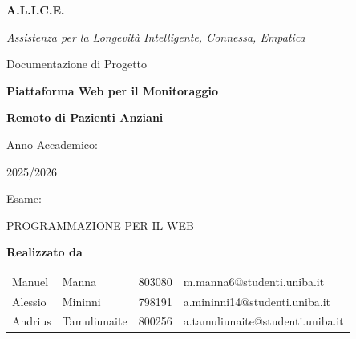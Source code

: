 \documentclass[12pt, a4paper]{article}
\begin{document}
\begin{titlepage}
  \thispagestyle{empty}
  \centering
  \vspace*{3cm}

  {\Huge\bfseries A.L.I.C.E.\par}
  \vspace{0.5cm}
  {\large\textit{Assistenza per la Longevit\`a Intelligente, Connessa, Empatica}\par}
  \vspace{2cm}

  {\LARGE Documentazione di Progetto\par}
  {\LARGE\bfseries Piattaforma Web per il Monitoraggio\par}
  {\LARGE\bfseries Remoto di Pazienti Anziani\par}
  \vspace{2cm}

  {\large Anno Accademico:\par}
  {\large 2025/2026\par}
  \vspace{1cm}

  {\large Esame:\par}
  {\large PROGRAMMAZIONE PER IL WEB\par}
  \vspace{1.5cm}

  {\large\bfseries Realizzato da\par}
  \vspace{0.5cm}
  \begin{tabular}{l l l l}
    Manuel  & Manna        & 803080 & m.manna6@studenti.uniba.it       \\
    Alessio & Mininni      & 798191 & a.mininni14@studenti.uniba.it    \\
    Andrius & Tamuliunaite & 800256 & a.tamuliunaite@studenti.uniba.it \\
  \end{tabular}

  \vfill
\end{titlepage}

\newpage
\tableofcontents
\newpage











\end{document}
